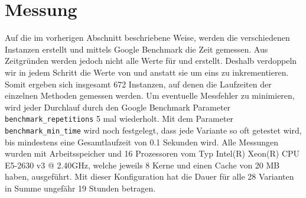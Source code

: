 \section{Messung}
Auf die im vorherigen Abschnitt beschriebene Weise, werden die verschiedenen Instanzen erstellt und
mittels Google Benchmark die Zeit gemessen. Aus Zeitgründen werden jedoch nicht alle Werte 
für \la{} und \sm{} erstellt. Deshalb verdoppeln wir in jedem Schritt die Werte von \la{} und \sm{}
anstatt sie um eins zu inkrementieren. Somit ergeben sich insgesamt 672 Instanzen, auf denen die Laufzeiten der 
einzelnen Methoden gemessen werden. Um eventuelle Messfehler zu minimieren, wird
jeder Durchlauf durch den Google Benchmark Parameter \texttt{benchmark\_repetitions} 5 mal wiederholt.
Mit dem Parameter \texttt{benchmark\_min\_time} wird noch festgelegt, dass jede Variante so oft getestet
wird, bis mindestens eine Gesamtlaufzeit von 0.1 Sekunden  wird. 
Alle Messungen wurden  mit  Arbeitsspeicher und 16 Prozessoren vom Typ Intel(R) Xeon(R) CPU E5-2630 v3 @ 2.40GHz,
welche jeweils 8 Kerne und einen Cache von 20 MB haben, ausgeführt.
Mit dieser Konfiguration hat die Dauer für alle 28 Varianten in Summe ungefähr 19 Stunden betragen.





